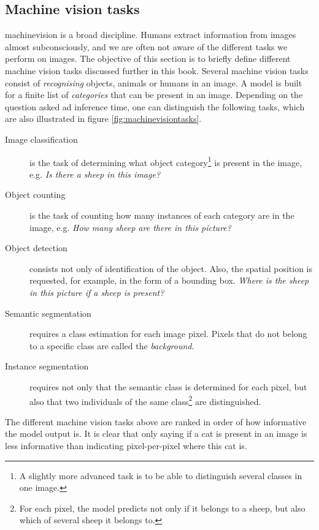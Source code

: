 \subsection{Machine vision tasks \label{sec:machinevisiontasks}}
\par{
    \Gls{machinevision} is a broad discipline. 
    Humans extract information from images almost subconsciously, and we are often not aware of the different tasks we perform on images.
    The objective of this section is to briefly define different machine vision tasks discussed further in this book. 
    Several machine vision tasks consist of \textit{recognising} objects, animals or humans in an image.
    A model is built for a finite list of \textit{categories} that can be present in an image.
    Depending on the question asked ad inference time, one can distinguish the following tasks, which are also illustrated in figure \ref{fig:machinevisiontasks}.
}
\begin{description}
    \item[Image classification] is the task of determining what object category\footnote{A slightly more advanced task is to be able to distinguish several classes in one image.} is present in the image, e.g. \textit{Is there a sheep in this image?}
    \item[Object counting] is the task of counting how many instances of each category are in the image, e.g. \textit{How many sheep are there in this picture?} 
    \item[Object detection] consists not only of identification of the object. Also, the spatial position is requested, for example, in the form of a bounding box. \textit{Where is the sheep in this picture if a sheep is present?}
    \item[Semantic segmentation] requires a class estimation for each image pixel. Pixels that do not belong to a specific class are called the \textit{background}.
    \item[Instance segmentation] requires not only that the semantic class is determined for each pixel, but also that two individuals of the same class\footnote{For each pixel, the model predicts not only if it belongs to a sheep, but also which of several sheep it belongs to.} are distinguished.   
\end{description}
\par{
    The different machine vision tasks above are ranked in order of how informative the model output is.
    It is clear that only saying if a cat is present in an image is less informative than indicating pixel-per-pixel where this cat is.
}
